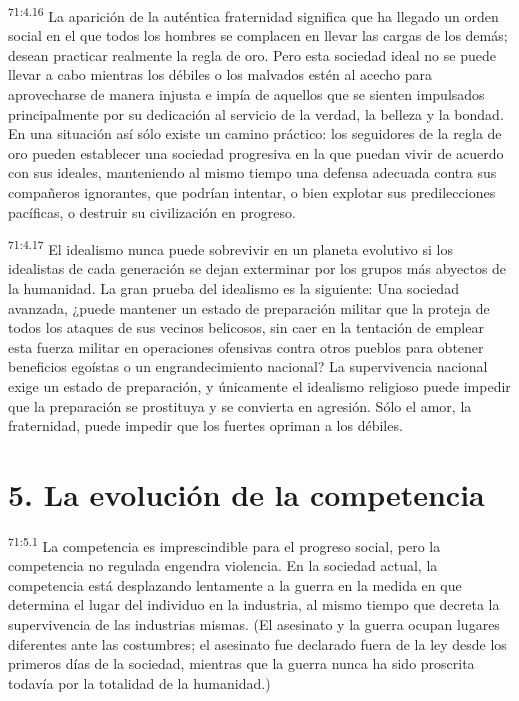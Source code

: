 \par
\textsuperscript{71:4.16} La aparición de la auténtica fraternidad significa que ha llegado un orden social en el que todos los hombres se complacen en llevar las cargas de los demás; desean practicar realmente la regla de oro. Pero esta sociedad ideal no se puede llevar a cabo mientras los débiles o los malvados estén al acecho para aprovecharse de manera injusta e impía de aquellos que se sienten impulsados principalmente por su dedicación al servicio de la verdad, la belleza y la bondad. En una situación así sólo existe un camino práctico: los seguidores de la regla de oro pueden establecer una sociedad progresiva en la que puedan vivir de acuerdo con sus ideales, manteniendo al mismo tiempo una defensa adecuada contra sus compañeros ignorantes, que podrían intentar, o bien explotar sus predilecciones pacíficas, o destruir su civilización en progreso.

\par
\textsuperscript{71:4.17} El idealismo nunca puede sobrevivir en un planeta evolutivo si los idealistas de cada generación se dejan exterminar por los grupos más abyectos de la humanidad. La gran prueba del idealismo es la siguiente: Una sociedad avanzada, ¿puede mantener un estado de preparación militar que la proteja de todos los ataques de sus vecinos belicosos, sin caer en la tentación de emplear esta fuerza militar en operaciones ofensivas contra otros pueblos para obtener beneficios egoístas o un engrandecimiento nacional? La supervivencia nacional exige un estado de preparación, y únicamente el idealismo religioso puede impedir que la preparación se prostituya y se convierta en agresión. Sólo el amor, la fraternidad, puede impedir que los fuertes opriman a los débiles.

\section*{5. La evolución de la competencia}
\par
\textsuperscript{71:5.1} La competencia es imprescindible para el progreso social, pero la competencia no regulada engendra violencia. En la sociedad actual, la competencia está desplazando lentamente a la guerra en la medida en que determina el lugar del individuo en la industria, al mismo tiempo que decreta la supervivencia de las industrias mismas. (El asesinato y la guerra ocupan lugares diferentes ante las costumbres; el asesinato fue declarado fuera de la ley desde los primeros días de la sociedad, mientras que la guerra nunca ha sido proscrita todavía por la totalidad de la humanidad.)

